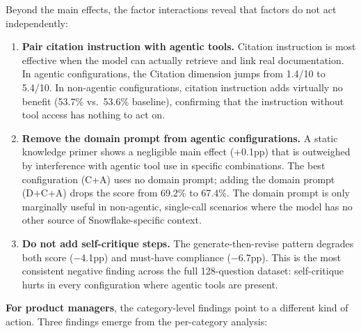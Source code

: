 \documentclass[10pt,letterpaper]{article}
\begin{document}
Beyond the main effects, the factor interactions reveal that factors do not act independently:

\begin{enumerate}[leftmargin=*,resume]
  \item \textbf{Pair citation instruction with agentic tools.} Citation instruction is most effective when the model can actually retrieve and link real documentation. In agentic configurations, the Citation dimension jumps from 1.4/10 to 5.4/10. In non-agentic configurations, citation instruction adds virtually no benefit (53.7\% vs.\ 53.6\% baseline), confirming that the instruction without tool access has nothing to act on.

  \item \textbf{Remove the domain prompt from agentic configurations.} A static knowledge primer shows a negligible main effect ($+$0.1pp) that is outweighed by interference with agentic tool use in specific combinations. The best configuration (C+A) uses no domain prompt; adding the domain prompt (D+C+A) drops the score from 69.2\% to 67.4\%. The domain prompt is only marginally useful in non-agentic, single-call scenarios where the model has no other source of Snowflake-specific context.

  \item \textbf{Do not add self-critique steps.} The generate-then-revise pattern degrades both score ($-$4.1pp) and must-have compliance ($-$6.7pp). This is the most consistent negative finding across the full 128-question dataset: self-critique hurts in every configuration where agentic tools are present.
\end{enumerate}

\textbf{For product managers}, the category-level findings point to a different kind of action. Three findings emerge from the per-category analysis:
\end{document}
